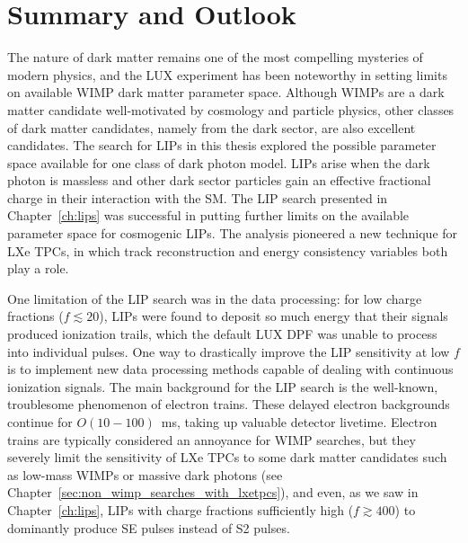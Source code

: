 \chapter{Summary and Outlook}\label{ch:conclusion} %


The nature of dark matter remains one of the most compelling mysteries of modern physics, and the \ac{LUX} experiment has been noteworthy in setting limits on available \ac{WIMP} dark matter parameter space. Although \ac{WIMP}s are a dark matter candidate well-motivated by cosmology and particle physics, other classes of dark matter candidates, namely from the dark sector, are also excellent candidates. The search for \ac{LIP}s in this thesis explored the possible parameter space available for one class of dark photon model. \ac{LIP}s arise when the dark photon is massless and other dark sector particles gain an effective fractional charge in their interaction with the \ac{SM}. The \ac{LIP} search presented in Chapter~\ref{ch:lips} was successful in putting further limits on the available parameter space for cosmogenic \ac{LIP}s. The analysis pioneered a new technique for \ac{LXe} \ac{TPC}s, in which track reconstruction and energy consistency variables both play a role. 

One limitation of the \ac{LIP} search was in the data processing: for low charge fractions ($f \lesssim 20$), \ac{LIP}s were found to deposit so much energy that their signals produced ionization trails, which the default \ac{LUX} \ac{DPF} was unable to process into individual pulses. One way to drastically improve the \ac{LIP} sensitivity at low $f$ is to implement new data processing methods capable of dealing with continuous ionization signals. The main background for the \ac{LIP} search is the well-known, troublesome phenomenon of electron trains. These delayed electron backgrounds continue for $O(10-100)$~ms, taking up valuable detector livetime. Electron trains are typically considered an annoyance for \ac{WIMP} searches, but they severely limit the sensitivity of \ac{LXe} \ac{TPC}s to some dark matter candidates such as low-mass \ac{WIMP}s or massive dark photons (see Chapter~\ref{sec:non_wimp_searches_with_lxetpcs}), and even, as we saw in Chapter~\ref{ch:lips}, \ac{LIP}s with charge fractions sufficiently high ($f \gtrsim 400$) to dominantly produce SE pulses instead of S2 pulses. 

